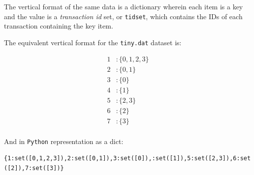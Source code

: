 \documentclass[11pt]{article}
\begin{document}
\begin{multicols}{2}
The vertical format of the same data is a dictionary wherein each item
is a key and the value is a \emph{transaction id} set, or
\texttt{tidset}, which contains the IDs of each transaction containing
the key item.

The equivalent vertical format for the \texttt{tiny.dat} dataset is:

\begin{align*}
  1 &: \{ 0, 1, 2, 3 \} \\
  2 &: \{ 0, 1 \} \\
  3 &: \{ 0 \} \\
  4 &: \{ 1 \} \\
  5 &: \{ 2, 3 \} \\
  6 &: \{ 2 \} \\
  7 &: \{ 3 \} \\
\end{align*}

And in \texttt{Python} representation as a dict:

\texttt{\{1:set([0,1,2,3]),2:set([0,1]),3:set([0]),:set([1]),5:set([2,3]),6:set([2]),7:set([3])\}}




\end{multicols} %
\end{document}
